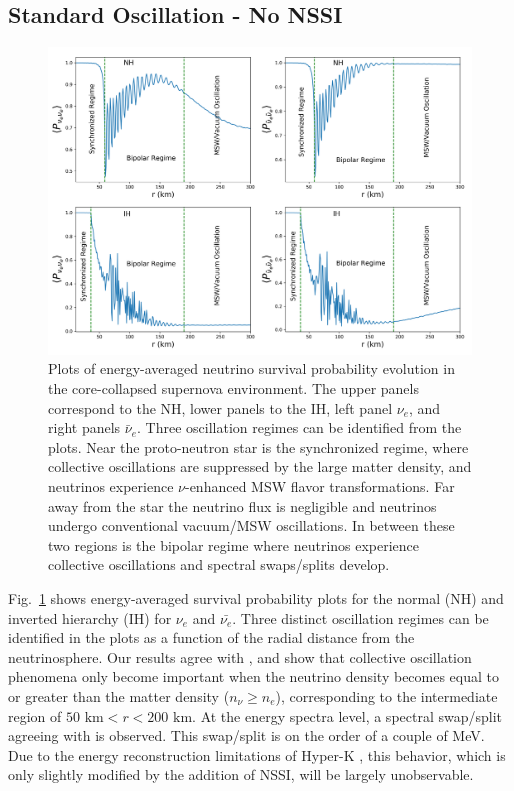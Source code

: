 \documentclass[a4paper,12pt]{article}
\begin{document}
\subsection{Standard Oscillation - No NSSI}
\begin{figure}[t]
\begin{center}
\includegraphics[width=14cm]{flavor_evo_std.png}
\caption{Plots of energy-averaged neutrino survival probability evolution in the core-collapsed supernova environment. The upper panels correspond to the NH, lower panels to the IH, left panel $\nu_{e}$, and right panels $\bar{\nu}_{e}$. Three oscillation regimes can be identified from the plots. Near the proto-neutron star is the synchronized regime, where collective oscillations are suppressed by the large matter density, and neutrinos experience $\nu$-enhanced MSW flavor transformations. Far away from the star the neutrino flux is negligible and neutrinos undergo conventional vacuum/MSW oscillations. In between these two regions is the bipolar regime where neutrinos experience collective oscillations and spectral swaps/splits develop.} 
\label{fig:fe_std}
\end{center}
\end{figure}

Fig.~\ref{fig:fe_std} shows energy-averaged survival probability plots for the normal (NH) and inverted hierarchy (IH) for $\nu_{e}$ and $\bar{\nu_{e}}$. Three distinct oscillation regimes can be identified in the plots as a function of the radial distance from the neutrinosphere.  Our results agree with \cite{Duan:2008eb}, and show that collective oscillation phenomena only become important when the neutrino density becomes equal to or greater than the matter density ($n_{\nu} \geq n_{e}$), corresponding to the intermediate region of $50\text{ km} < r < 200\text{ km}$. At the energy spectra level, a spectral swap/split agreeing with \cite{Duan:2008eb} is observed. This swap/split is on the order of a couple of MeV. Due to the energy reconstruction limitations of Hyper-K \cite{Abe:2018uyc}, this behavior, which is only slightly modified by the addition of NSSI, will be largely unobservable. 
\end{document}
